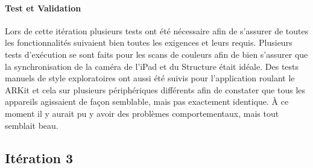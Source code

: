 \documentclass[rapport.tex]{subfiles}
\begin{document}
\paragraph*{Test et Validation}
Lors de cette itération plusieurs tests ont été nécessaire afin de s'assurer de toutes les fonctionnalités suivaient bien toutes les exigences et leurs requis. Plusieurs tests d'exécution se sont faits pour les scans de couleurs afin de bien s’assurer que la synchronisation de la caméra de l’iPad et du Structure était idéale. Des tests manuels de style exploratoires ont aussi été suivis pour l’application roulant le ARKit et cela sur plusieurs périphériques différents afin de constater que tous les appareils agissaient de façon semblable, mais pas exactement identique. À ce moment il y aurait pu y avoir des problèmes comportementaux, mais tout semblait beau.
\subsection*{Itération 3}
\end{document}
